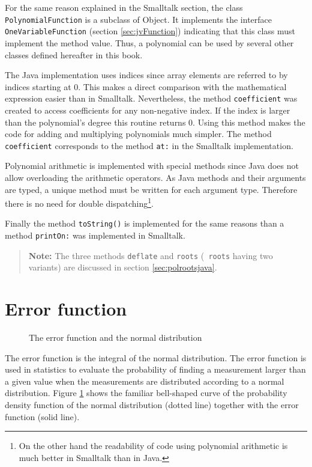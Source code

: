 \documentclass[twoside]{book}
\begin{document}
For the same reason explained in the Smalltalk section, the class
{\tt PolynomialFunction} is a subclass of Object. It implements
the interface {\tt OneVariableFunction} (\cf section
\ref{sec:jvFunction}) indicating that this class must implement
the method value. Thus, a polynomial can be used by several other
classes defined hereafter in this book.

The Java implementation uses indices since array elements are
referred to by indices starting at 0. This makes a direct
comparison with the mathematical expression easier than in
Smalltalk. Nevertheless, the method {\tt coefficient} was created
to access coefficients for any non-negative index. If the index is
larger than the polynomial's degree this routine returns 0. Using
this method makes the code for adding and multiplying polynomials
much simpler. The method {\tt coefficient} corresponds to the
method {\tt at:} in the Smalltalk implementation.

Polynomial arithmetic is implemented with special methods since
Java does not allow overloading the arithmetic operators. As Java
methods and their arguments are typed, a unique method must be
written for each argument type. Therefore there is no need for
double dispatching\footnote{On the other hand the readability of
code using polynomial arithmetic is much better in Smalltalk than
in Java.}.

Finally the method {\tt toString()} is implemented for the same
reasons than a method {\tt printOn:} was implemented in Smalltalk.

\begin{listing}
\label{lj:polynomial}

\end{listing}
\begin{quote}
{\bf Note:} The three methods {\tt deflate} and {\tt roots} ({\tt
roots} having two variants) are discussed in section
\ref{sec:polrootsjava}.
\end{quote}


\section{Error function}
\label{sec:errorFunction}
\begin{figure}
\center{}
\caption{The error function and the normal
distribution}\label{fig:errorFunction}
\end{figure}
The error function is the integral of the normal distribution. The
error function is used in statistics to evaluate the probability
of finding a measurement larger than a given value when the
measurements are distributed according to a normal distribution.
Figure \ref{sec:errorFunction} shows the familiar bell-shaped
curve of the probability density function of the normal
distribution (dotted line) together with the error function (solid
line).
\end{document}
